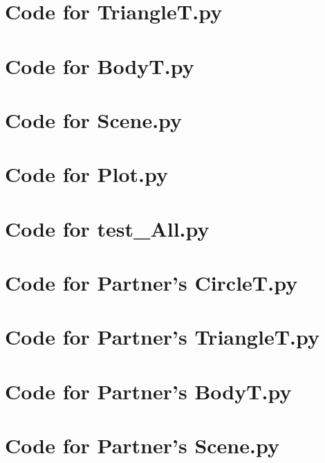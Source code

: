 \documentclass[12pt]{article}
\begin{document}
\newpage

\section{Code for TriangleT.py}

\noindent 

\newpage

\section{Code for BodyT.py}

\noindent 

\newpage

\section{Code for Scene.py}

\noindent 

\newpage

\section{Code for Plot.py}

\noindent 

\newpage

\section{Code for test\_All.py}

\noindent 

\newpage

\section{Code for Partner's CircleT.py}

\noindent 

\newpage

\section{Code for Partner's TriangleT.py}

\noindent 

\newpage

\section{Code for Partner's BodyT.py}

\noindent 

\newpage

\section{Code for Partner's Scene.py}

\noindent 

\newpage
\end{document}
